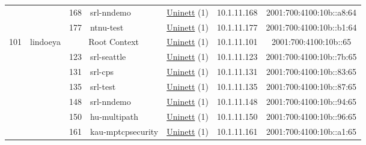 \begin{small}
\begin{center}
\begin{longtable}{|c|c|c|c|c|c|c|c|}
  &  & \tiny{168} & \multicolumn{1}{|l|}{\tiny{srl-nndemo}} & \multicolumn{2}{|c|}{\tiny{\href{https://www.uninett.no}{Uninett} (1)}} & \tiny{10.1.11.168} & \tiny{2001:700:4100:10b::a8:64} \\* \cline{3-3}\cline{4-4}\cline{5-5}\cline{6-6}\cline{7-7}\cline{8-8}
  &  & \tiny{177} & \multicolumn{1}{|l|}{\tiny{ntnu-test}} & \multicolumn{2}{|c|}{\tiny{\href{https://www.uninett.no}{Uninett} (1)}} & \tiny{10.1.11.177} & \tiny{2001:700:4100:10b::b1:64} \\ \hline
 \multirow{9}{*}{\tiny{101}} & \multicolumn{1}{|l|}{\multirow{9}{*}{\tiny{lindoeya}}} & \multicolumn{2}{|c|}{\tiny{Root Context}} & \multicolumn{2}{|c|}{\tiny{\href{https://www.uninett.no}{Uninett} (1)}} & \tiny{10.1.11.101} & \tiny{2001:700:4100:10b::65} \\* \cline{3-3}\cline{4-4}\cline{5-5}\cline{6-6}\cline{7-7}\cline{8-8}
  &  & \tiny{123} & \multicolumn{1}{|l|}{\tiny{srl-seattle}} & \multicolumn{2}{|c|}{\tiny{\href{https://www.uninett.no}{Uninett} (1)}} & \tiny{10.1.11.123} & \tiny{2001:700:4100:10b::7b:65} \\* \cline{3-3}\cline{4-4}\cline{5-5}\cline{6-6}\cline{7-7}\cline{8-8}
  &  & \tiny{131} & \multicolumn{1}{|l|}{\tiny{srl-cps}} & \multicolumn{2}{|c|}{\tiny{\href{https://www.uninett.no}{Uninett} (1)}} & \tiny{10.1.11.131} & \tiny{2001:700:4100:10b::83:65} \\* \cline{3-3}\cline{4-4}\cline{5-5}\cline{6-6}\cline{7-7}\cline{8-8}
  &  & \tiny{135} & \multicolumn{1}{|l|}{\tiny{srl-test}} & \multicolumn{2}{|c|}{\tiny{\href{https://www.uninett.no}{Uninett} (1)}} & \tiny{10.1.11.135} & \tiny{2001:700:4100:10b::87:65} \\* \cline{3-3}\cline{4-4}\cline{5-5}\cline{6-6}\cline{7-7}\cline{8-8}
  &  & \tiny{148} & \multicolumn{1}{|l|}{\tiny{srl-nndemo}} & \multicolumn{2}{|c|}{\tiny{\href{https://www.uninett.no}{Uninett} (1)}} & \tiny{10.1.11.148} & \tiny{2001:700:4100:10b::94:65} \\* \cline{3-3}\cline{4-4}\cline{5-5}\cline{6-6}\cline{7-7}\cline{8-8}
  &  & \tiny{150} & \multicolumn{1}{|l|}{\tiny{hu-multipath}} & \multicolumn{2}{|c|}{\tiny{\href{https://www.uninett.no}{Uninett} (1)}} & \tiny{10.1.11.150} & \tiny{2001:700:4100:10b::96:65} \\* \cline{3-3}\cline{4-4}\cline{5-5}\cline{6-6}\cline{7-7}\cline{8-8}
  &  & \tiny{161} & \multicolumn{1}{|l|}{\tiny{kau-mptcpsecurity}} & \multicolumn{2}{|c|}{\tiny{\href{https://www.uninett.no}{Uninett} (1)}} & \tiny{10.1.11.161} & \tiny{2001:700:4100:10b::a1:65} \\* \cline{3-3}\cline{4-4}\cline{5-5}\cline{6-6}\cline{7-7}\cline{8-8}

\end{longtable}
\end{center}
\end{small}
